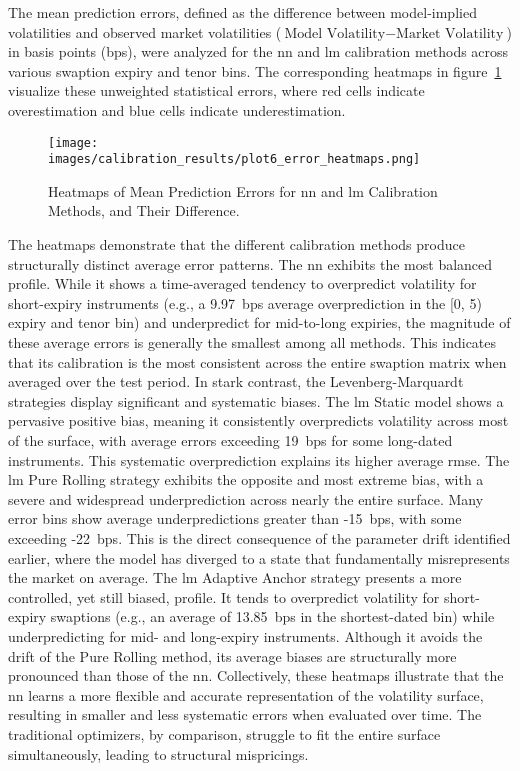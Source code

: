 The mean prediction errors, defined as the difference between model-implied volatilities and observed market volatilities (\(\text{Model Volatility} - \text{Market Volatility}\)) in basis points (\ac{bps}), were analyzed for the \ac{nn} and \ac{lm} calibration methods across various swaption expiry and tenor bins. The corresponding heatmaps in figure~\ref{fig:error_heatmaps} visualize these unweighted statistical errors, where red cells indicate overestimation and blue cells indicate underestimation.

\begin{figure}[H]
	\centering
	\texttt{[image: images/calibration\_results/plot6\_error\_heatmaps.png]}
	\caption{Heatmaps of Mean Prediction Errors for \ac{nn} and \ac{lm} Calibration Methods, and Their Difference.}
	\label{fig:error_heatmaps}
\end{figure}

The heatmaps demonstrate that the different calibration methods produce structurally distinct average error patterns. The \ac{nn} exhibits the most balanced profile. While it shows a time-averaged tendency to overpredict volatility for short-expiry instruments (e.g., a 9.97~\ac{bps} average overprediction in the [0, 5) expiry and tenor bin) and underpredict for mid-to-long expiries, the magnitude of these average errors is generally the smallest among all methods. This indicates that its calibration is the most consistent across the entire swaption matrix when averaged over the test period. In stark contrast, the Levenberg-Marquardt strategies display significant and systematic biases. The \ac{lm} Static model shows a pervasive positive bias, meaning it consistently overpredicts volatility across most of the surface, with average errors exceeding 19~\ac{bps} for some long-dated instruments. This systematic overprediction explains its higher average \ac{rmse}. The \ac{lm} Pure Rolling strategy exhibits the opposite and most extreme bias, with a severe and widespread underprediction across nearly the entire surface. Many error bins show average underpredictions greater than -15~\ac{bps}, with some exceeding -22~\ac{bps}. This is the direct consequence of the parameter drift identified earlier, where the model has diverged to a state that fundamentally misrepresents the market on average. The \ac{lm} Adaptive Anchor strategy presents a more controlled, yet still biased, profile. It tends to overpredict volatility for short-expiry swaptions (e.g., an average of 13.85~\ac{bps} in the shortest-dated bin) while underpredicting for mid- and long-expiry instruments. Although it avoids the drift of the Pure Rolling method, its average biases are structurally more pronounced than those of the \ac{nn}. Collectively, these heatmaps illustrate that the \ac{nn} learns a more flexible and accurate representation of the volatility surface, resulting in smaller and less systematic errors when evaluated over time. The traditional optimizers, by comparison, struggle to fit the entire surface simultaneously, leading to structural mispricings.

